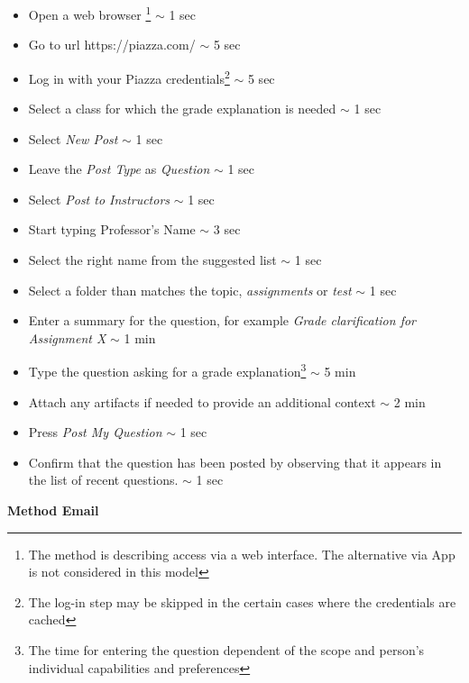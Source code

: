 \documentclass[12pt,letterpaper]{article}
\begin{document}
\begin{itemize}
    \itemsep-0.2em 
    \item Open a web browser \footnote{The method is describing access via a web interface. The alternative via App is not considered in this model}  $\sim$ 1 sec
    \item Go to url https://piazza.com/ $\sim$ 5 sec 
    \item Log in with your Piazza credentials\footnote{The log-in step may be skipped in the certain cases where the credentials are cached} $\sim$ 5 sec 
    \item Select a class for which the grade explanation is needed $\sim$ 1 sec
    \item Select \textit{New Post} $\sim$ 1 sec
    \item Leave the \textit{Post Type} as \textit{Question} $\sim$ 1 sec
    \item Select \textit{Post to Instructors} $\sim$ 1 sec
    \item Start typing Professor's Name  $\sim$ 3 sec
    \item Select the right name from the suggested list $\sim$ 1 sec
    \item Select a folder than matches the topic, \textit{assignments} or \textit{test} $\sim$ 1 sec
    \item Enter a summary for the question, for example \textit{Grade clarification for Assignment X} $\sim$ 1 min
    \item Type the question asking for a grade explanation\footnote{The time for entering the question dependent of the scope and person's individual capabilities and preferences} $\sim$ 5 min
    \item Attach any artifacts if needed to provide an additional context $\sim$ 2 min
    \item Press \textit{Post My Question} $\sim$ 1 sec
    \item Confirm that the question has been posted by observing that it appears in the list of recent questions. $\sim$ 1 sec
\end{itemize}

\textbf{Method Email}
\end{document}
